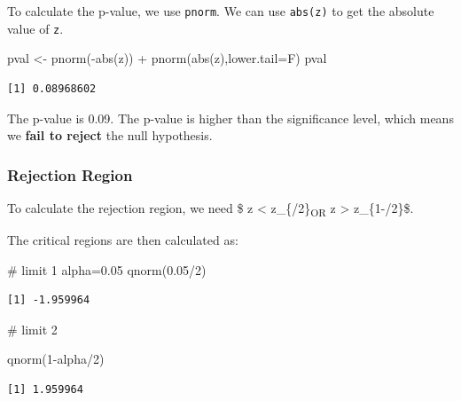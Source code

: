 \documentclass[
  letterpaper,
  DIV=11,
  numbers=noendperiod]{scrartcl}
\newenvironment{Shaded}{\begin{snugshade}}{\end{snugshade}}
\newcommand{\AttributeTok}[1]{\textcolor[rgb]{0.40,0.45,0.13}{#1}}
\newcommand{\CommentTok}[1]{\textcolor[rgb]{0.37,0.37,0.37}{#1}}
\newcommand{\DecValTok}[1]{\textcolor[rgb]{0.68,0.00,0.00}{#1}}
\newcommand{\FloatTok}[1]{\textcolor[rgb]{0.68,0.00,0.00}{#1}}
\newcommand{\FunctionTok}[1]{\textcolor[rgb]{0.28,0.35,0.67}{#1}}
\newcommand{\NormalTok}[1]{\textcolor[rgb]{0.00,0.23,0.31}{#1}}
\newcommand{\OtherTok}[1]{\textcolor[rgb]{0.00,0.23,0.31}{#1}}
\newcommand{\SpecialCharTok}[1]{\textcolor[rgb]{0.37,0.37,0.37}{#1}}
\begin{document}
To calculate the p-value, we use \texttt{pnorm}. We can use
\texttt{abs(z)} to get the absolute value of \texttt{z}.

\begin{Shaded}
\begin{Highlighting}[]
\NormalTok{pval }\OtherTok{\textless{}{-}} \FunctionTok{pnorm}\NormalTok{(}\SpecialCharTok{{-}}\FunctionTok{abs}\NormalTok{(z)) }\SpecialCharTok{+} \FunctionTok{pnorm}\NormalTok{(}\FunctionTok{abs}\NormalTok{(z),}\AttributeTok{lower.tail=}\NormalTok{F)}
\NormalTok{pval}
\end{Highlighting}
\end{Shaded}

\begin{verbatim}
[1] 0.08968602
\end{verbatim}

The p-value is 0.09. The p-value is higher than the significance level,
which means we \textbf{fail to reject} the null hypothesis.

\subsubsection{Rejection Region}

To calculate the rejection region, we need \$ z \textless{}
z\_\{\alpha/2\}\textsubscript{OR} z \textgreater{} z\_\{1-\alpha/2\}\$.

The critical regions are then calculated as:

\begin{Shaded}
\begin{Highlighting}[]
\CommentTok{\# limit 1}
\NormalTok{alpha}\OtherTok{=}\FloatTok{0.05}
\FunctionTok{qnorm}\NormalTok{(}\FloatTok{0.05}\SpecialCharTok{/}\DecValTok{2}\NormalTok{)}
\end{Highlighting}
\end{Shaded}

\begin{verbatim}
[1] -1.959964
\end{verbatim}

\begin{Shaded}
\begin{Highlighting}[]
\CommentTok{\# limit 2}

\FunctionTok{qnorm}\NormalTok{(}\DecValTok{1}\SpecialCharTok{{-}}\NormalTok{alpha}\SpecialCharTok{/}\DecValTok{2}\NormalTok{)}
\end{Highlighting}
\end{Shaded}

\begin{verbatim}
[1] 1.959964
\end{verbatim}
\end{document}
